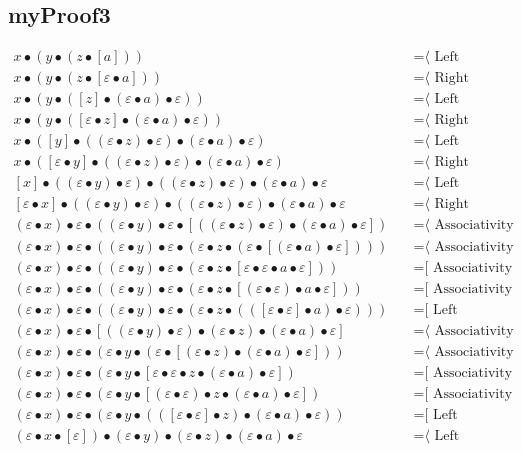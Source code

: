 \documentclass{article}
\begin{document}
\subsection{myProof3}
\begin{align*}
x • (y • (z • [a]))
  & \quad \text{=⟨ Left neutrality ]}\\
x • (y • (z • [ε • a]))
  & \quad \text{=⟨ Right neutrality ]}\\
x • (y • ([z] • (ε • a) • ε))
  & \quad \text{=⟨ Left neutrality ]}\\
x • (y • ([ε • z] • (ε • a) • ε))
  & \quad \text{=⟨ Right neutrality ]}\\
x • ([y] • ((ε • z) • ε) • (ε • a) • ε)
  & \quad \text{=⟨ Left neutrality ]}\\
x • ([ε • y] • ((ε • z) • ε) • (ε • a) • ε)
  & \quad \text{=⟨ Right neutrality ]}\\
[x] • ((ε • y) • ε) • ((ε • z) • ε) • (ε • a) • ε
  & \quad \text{=⟨ Left neutrality ]}\\
[ε • x] • ((ε • y) • ε) • ((ε • z) • ε) • (ε • a) • ε
  & \quad \text{=⟨ Right neutrality ]}\\
(ε • x) • ε • ((ε • y) • ε • [((ε • z) • ε) • (ε • a) • ε])
  & \quad \text{=⟨ Associativity ]}\\
(ε • x) • ε • ((ε • y) • ε • (ε • z • (ε • [(ε • a) • ε])))
  & \quad \text{=⟨ Associativity ]}\\
(ε • x) • ε • ((ε • y) • ε • (ε • z • [ε • ε • a • ε]))
  & \quad \text{=[ Associativity ⟩}\\
(ε • x) • ε • ((ε • y) • ε • (ε • z • [(ε • ε) • a • ε]))
  & \quad \text{=[ Associativity ⟩}\\
(ε • x) • ε • ((ε • y) • ε • (ε • z • (([ε • ε] • a) • ε)))
  & \quad \text{=[ Left neutrality ⟩}\\
(ε • x) • ε • [((ε • y) • ε) • (ε • z) • (ε • a) • ε]
  & \quad \text{=⟨ Associativity ]}\\
(ε • x) • ε • (ε • y • (ε • [(ε • z) • (ε • a) • ε]))
  & \quad \text{=⟨ Associativity ]}\\
(ε • x) • ε • (ε • y • [ε • ε • z • (ε • a) • ε])
  & \quad \text{=[ Associativity ⟩}\\
(ε • x) • ε • (ε • y • [(ε • ε) • z • (ε • a) • ε])
  & \quad \text{=[ Associativity ⟩}\\
(ε • x) • ε • (ε • y • (([ε • ε] • z) • (ε • a) • ε))
  & \quad \text{=[ Left neutrality ⟩}\\
(ε • x • [ε]) • (ε • y) • (ε • z) • (ε • a) • ε
  & \quad \text{=⟨ Left neutrality ]}\\

\end{align*}
\end{document}
